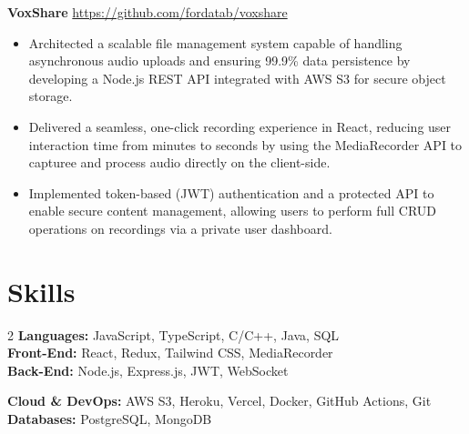 \documentclass[11pt]{article}       %
\begin{document}
\textbf{VoxShare} \hfill \href{https://github.com/fordatab/voxshare}{https://github.com/fordatab/voxshare} \
\vspace{-10pt}
\begin{itemize}
\item Architected a scalable file management system capable of handling asynchronous audio uploads and ensuring 99.9\% data persistence by developing a Node.js REST API integrated with AWS S3 for secure object storage.
\item Delivered a seamless, one-click recording experience in React, reducing user interaction time from minutes to seconds by using the MediaRecorder API to capturee and process audio directly on the client-side.
\item Implemented token-based (JWT) authentication and a protected API to enable secure content management, allowing users to perform full CRUD operations on recordings via a private user dashboard.
\end{itemize}


\vspace{-18.5pt}

\section*{Skills}
\noindent\begin{minipage}{\textwidth}


\begin{multicols}{2}
    \noindent\textbf{Languages:} JavaScript, TypeScript, C/C++, Java, SQL \\
    \textbf{Front-End:} React, Redux, Tailwind CSS, MediaRecorder  \\
    \textbf{Back-End:} Node.js, Express.js, JWT, WebSocket
    
    \columnbreak %
    
    \noindent\textbf{Cloud \& DevOps:} AWS S3, Heroku, Vercel, Docker, GitHub Actions, Git \\
    \textbf{Databases:} PostgreSQL, MongoDB
\end{multicols}
\end{minipage}
\end{document}
